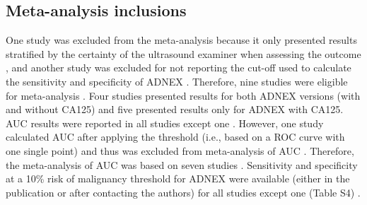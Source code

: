 \subsection{Meta-analysis inclusions}
One study was excluded from the meta-analysis because it only presented results
stratified by the certainty of the ultrasound examiner when assessing the outcome
 \cite{szubertPerformanceSelectedModels2020}, and another study was excluded for not
reporting the cut-off used to calculate the sensitivity and specificity of \gls{ADNEX}
 \cite{ounPreoperativeRiskAssessment2023}. Therefore, nine studies were eligible for
meta-analysis
 \cite{vancalsterValidationModelsDiagnose2020,diazOvarianTumorsRisk2017a,tugPreoperativeDiscriminatingPerformance2020,behnamfarComparisonUltrasoundTumor2022,meysEstimatingRiskMalignancy2017,qianComparisonDiagnosticPerformances2021,sandalComparisionRiskMalignancy2018a,wangEvaluatingRiskMalignancy2023,borgesProspectiveExternalValidation2024}.
Four studies presented results for both \gls{ADNEX} versions (with and without CA125) and
five presented results only for \gls{ADNEX} with CA125. \gls{AUC} results were reported in all
studies except one \cite{sandalComparisionRiskMalignancy2018a}. However, one study
calculated \gls{AUC} after applying the threshold (i.e., based on a \gls{ROC} curve with one
single point) and thus was excluded from meta-analysis of \gls{AUC}
 \cite{wangEvaluatingRiskMalignancy2023}. Therefore, the meta-analysis of \gls{AUC} was
based on seven studies
 \cite{vancalsterValidationModelsDiagnose2020,diazOvarianTumorsRisk2017a,tugPreoperativeDiscriminatingPerformance2020,behnamfarComparisonUltrasoundTumor2022,meysEstimatingRiskMalignancy2017,qianComparisonDiagnosticPerformances2021,borgesProspectiveExternalValidation2024}.
Sensitivity and specificity at a 10\% risk of malignancy threshold for \gls{ADNEX} were
available (either in the publication or after contacting the authors) for all studies
except one (Table S4) \cite{behnamfarComparisonUltrasoundTumor2022}.

